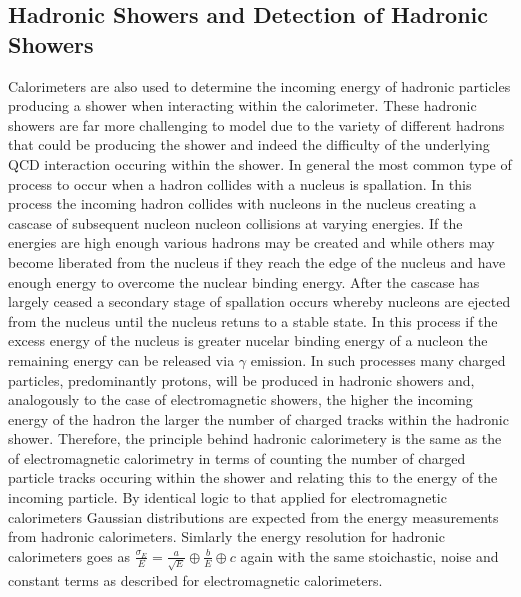 \subsection{Hadronic Showers and Detection of Hadronic Showers}
Calorimeters are also used to determine the incoming energy of hadronic particles producing a shower when interacting within the calorimeter.  These hadronic showers are far more challenging to model due to the variety of different hadrons that could be producing the shower and indeed the difficulty of the underlying QCD interaction occuring within the shower.  In general the most common type of process to occur when a hadron collides with a nucleus is spallation.  In this process the incoming hadron collides with nucleons in the nucleus creating a cascase of subsequent nucleon nucleon collisions at varying energies.  If the energies are high enough various hadrons may be created and while others may become liberated from the nucleus if they reach the edge of the nucleus and have enough energy to overcome the nuclear binding energy.  After the cascase has largely ceased a secondary stage of spallation occurs whereby nucleons are ejected from the nucleus until the nucleus retuns to a stable state.  In this process if the excess energy of the nucleus is greater nucelar binding energy of a nucleon the remaining energy can be released via $\gamma$ emission.  In such processes many charged particles, predominantly protons, will be produced in hadronic showers and, analogously to the case of electromagnetic showers, the higher the incoming energy of the hadron the larger the number of charged tracks within the hadronic shower.  Therefore, the principle behind hadronic calorimetery is the same as the of electromagnetic calorimetry in terms of counting the number of charged particle tracks occuring within the shower and relating this to the energy of the incoming particle.  By identical logic to that applied for electromagnetic calorimeters Gaussian distributions are expected from the energy measurements from hadronic calorimeters.  Simlarly the energy resolution for hadronic calorimeters goes as $\frac{\sigma_{E}}{E} = \frac{a}{\sqrt{E}} \oplus \frac{b}{E} \oplus c$ again with the same stoichastic, noise and constant terms as described for electromagnetic calorimeters.

